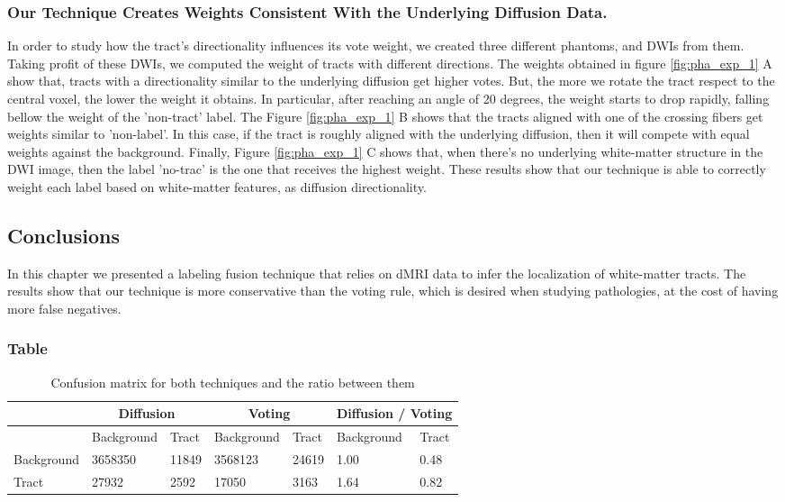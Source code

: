 \subsubsection{Our Technique Creates Weights Consistent With the Underlying
               Diffusion Data.}
In order to study how the tract's directionality influences its vote weight,
we created three different phantoms, and DWIs from them. Taking profit of 
these DWIs, we computed the weight of tracts with different directions. 
The weights obtained in figure \ref{fig:pha_exp_1} A show that, tracts
with a directionality similar to the underlying diffusion get higher votes.
But, the more we rotate the tract respect to the central voxel, the lower the
weight it obtains. In particular, after reaching an angle of 20 degrees, the
weight starts to drop rapidly, falling bellow the weight of the 'non-tract' label.
The Figure \ref{fig:pha_exp_1} B shows that the tracts aligned with one of the 
crossing fibers get weights similar to 'non-label'. In this case, if the tract
is roughly aligned with the underlying diffusion, then it will compete with
equal weights against the background. Finally, Figure \ref{fig:pha_exp_1} C
shows that, when there's no underlying white-matter structure in the DWI image,
then the label 'no-trac' is the one that receives the highest weight. These
results show that our technique is able to correctly weight each label based
on white-matter features, as diffusion directionality.


\subsection{Conclusions}
In this chapter we presented a labeling fusion technique that relies on dMRI
data to infer the localization of white-matter tracts. The results show that
our technique is more conservative than the voting rule, which is desired when
studying pathologies, at the cost of having more false negatives.

\subsubsection*{Table}

\begin{table}[]
\centering
\caption{Confusion matrix for both techniques and the ratio between them}
\label{my-label}
\begin{tabular}{|l||l|l||l|l||l|l|}
\hline
      & \multicolumn{2}{c||}{Diffusion} & \multicolumn{2}{c||}{Voting} &  \multicolumn{2}{|c|}{Diffusion / Voting} \\ 
      \hline
            & Background  & Tract & Background  & Tract     & Background  & Tract \\
      \hline
Background  & 3658350     & 11849 & 3568123     & 24619     & 1.00        & 0.48   \\
      \hline
Tract       & 27932       & 2592  & 17050       & 3163      & 1.64        & 0.82   \\
\hline
\end{tabular}
\end{table}

